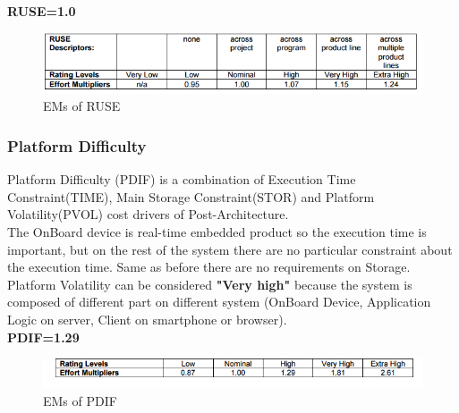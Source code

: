 			\textbf{RUSE=1.0}
			
		\begin{figure}[H] 
			\centering
			\includegraphics[scale = 0.6]{img/RUSE.png}
			\caption{EMs of RUSE}
		\end{figure}

\subsubsection{Platform Difficulty}		
Platform Difficulty (PDIF) is a combination of Execution Time Constraint(TIME), Main Storage Constraint(STOR) and Platform Volatility(PVOL) cost drivers of Post-Architecture. 
		\\
		The OnBoard device is real-time embedded product so the execution time is important, but on the rest of the system there are no particular constraint about the execution time. Same as before there are no requirements on Storage.
		Platform Volatility can be considered \textbf{"Very high"} because the system is composed of different part on different system (OnBoard Device, Application Logic on server, Client on smartphone or browser).
		\\
		\textbf{PDIF=1.29}
		
		\begin{figure}[H] 
			\centering
			\includegraphics[scale = 0.6]{img/PDIF.png}
			\caption{EMs of PDIF}
		\end{figure}
	
